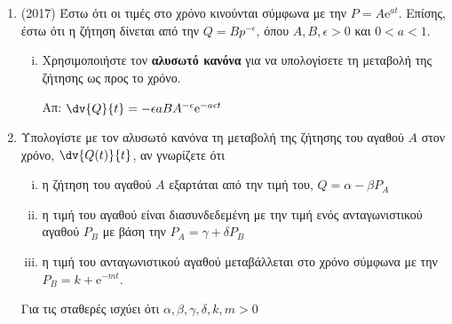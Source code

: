 \begin{enumerate}
  \item {(2017)} Έστω ότι οι τιμές στο χρόνο κινούνται σύμφωνα με την $ P= A \mathrm{e}^{at} $. 
    Επίσης, έστω ότι η ζήτηση δίνεται από την $ Q = Bp^{- \epsilon} $, όπου $ A,B,
    \epsilon > 0 $ και $ 0<a<1 $. 
    \begin{enumerate}[i)]
      \item Χρησιμοποιήστε τον \textbf{αλυσωτό κανόνα} για να υπολογίσετε
        τη μεταβολή της ζήτησης ως προς το χρόνο.

        \hfill Απ: $ \dv{Q}{t} = - \epsilon aBA^{- \epsilon} \mathrm{e}^{-a\epsilon t} $ 

        \end{enumerate}

      \item Υπολογίστε με τον αλυσωτό κανόνα τη μεταβολή της ζήτησης του αγαθού $A$ στον
        χρόνο, $ \dv{Q(t)}{t} $, αν γνωρίζετε ότι 
        \begin{enumerate}[i)]
          \item η ζήτηση του αγαθού $A$ εξαρτάται από την τιμή του, $ Q= \alpha -
            \beta P_{A} $
          \item η τιμή του αγαθού είναι διασυνδεδεμένη με την τιμή ενός ανταγωνιστικού
            αγαθού $ P_{B} $ με βάση την $ P_{A}= \gamma + \delta P_{B} $
          \item η τιμή του ανταγωνιστικού αγαθού μεταβάλλεται στο χρόνο σύμφωνα με την 
            $ P_{B}=k + \mathrm{e}^{-mt} $. 
    \end{enumerate}

        Για τις σταθερές ισχύει ότι $ \alpha, \beta , \gamma , \delta , k , m >0 $
\end{enumerate}


\begin{center}
  \minibox{\large\bfseries \textcolor{Col1}{Ελαστικότητα}}
\end{center}

\vspace{\baselineskip}

